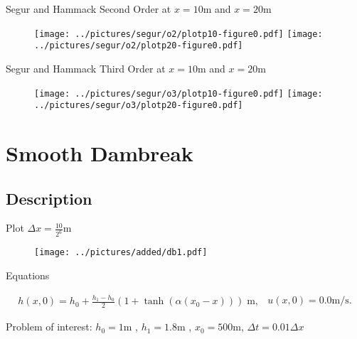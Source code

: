 \documentclass[pdf]{beamer}
\begin{document}
\begin{frame}{Segur and Hammack}
Second Order at $x = 10\text{m}$ and $x = 20 \text{m}$
\begin{figure}
\texttt{[image: ../pictures/segur/o2/plotp10-figure0.pdf]}
\texttt{[image: ../pictures/segur/o2/plotp20-figure0.pdf]}
\end{figure}
\end{frame}

\begin{frame}{Segur and Hammack}
Third Order at $x = 10\text{m}$ and $x = 20 \text{m}$
\begin{figure}
\texttt{[image: ../pictures/segur/o3/plotp10-figure0.pdf]}
\texttt{[image: ../pictures/segur/o3/plotp20-figure0.pdf]}
\end{figure}
\end{frame}

\section{Smooth Dambreak}
\subsection{Description}

\begin{frame}{Plot}
$\Delta x = \frac{10}{2^6} \text{m}$
\begin{figure}
\texttt{[image: ../pictures/added/db1.pdf]}
\end{figure}

\end{frame}

\begin{frame}{Equations}

\begin{subequations}
\begin{gather}
h(x,0) = h_0 + \frac{h_1 - h_0}{2}\left(1 + \tanh\left(\alpha\left(x_0 - x\right)\right)\right) \; \text{m},
\end{gather}
\begin{gather}
u(x,0) = 0.0 \text{m}/\text{s}.
\end{gather}
\end{subequations}
\label{eq:sdbi}

Problem of interest:
$h_0 = 1\text{m}$ , $h_1 = 1.8\text{m}$ , $x_0 = 500\text{m}$, $\Delta t = 0.01 \Delta x$
\end{frame}
\end{document}

